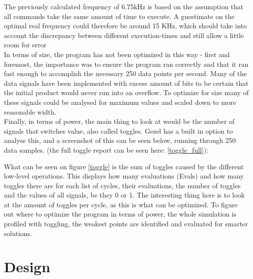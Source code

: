 \documentclass[12pt,a4paper]{article}
\begin{document}
	The previously calculated frequency of 6.75kHz is based on the assumption that all commands take the same amount of time to execute. A guestimate on the optimal real frequency could therefore be around 15 KHz, which should take into account the discrepancy between different execution-times and still allow a little room for error\\
	In terms of size, the program has not been optimized in this way - first and foremost, the importance was to ensure the program ran correctly and that it ran fast enough to accomplish the necessary 250 data points per second. Many of the data signals have been implemented with excess amount of bits to be certain that the initial product would never run into an overflow. To optimize for size many of these signals could be analysed for maximum values and scaled down to more reasonable width.\\
	Finally, in terms of power, the main thing to look at would be the number of signals that switches value, also called toggles. Gezel has a built in option to analyse this, and a screenshot of this can be seen below, running through 250 data samples. (the full toggle report can be seen here: \ref{toggle_full}):	

\label{toggle}
	
	What can be seen on figure \ref{toggle} is the sum of toggles caused by the different low-level operations. This displays how many evaluations (Evals) and how many toggles there are for each 
	 list of cycles, their evaluations, the number of toggles and the values of all signals, be they 0 or 1. The interesting thing here is to look at the amount of toggles per cycle, as this is what can be optimized. To figure out where to optimize the program in terms of power, the whole simulation is profiled with toggling, the weakest points are identified and evaluated for smarter solutions.\\


\section{Design}
\end{document}
